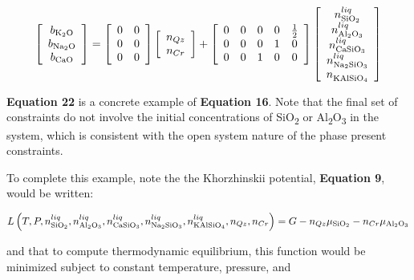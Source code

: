 \documentclass[11pt, titlepage, twoside]{article}
\begin{document}
\begin{MPEquation}[!ht]
\begin{equation}
\left[ {\begin{array}{*{20}{c}}
{{b_{{{\rm{K}}_2}{\rm{O}}}}}\\
{{b_{{\rm{N}}{{\rm{a}}_2}{\rm{O}}}}}\\
{{b_{{\rm{CaO}}}}}
\end{array}} \right] = \left[ {\begin{array}{*{20}{c}}
0&0\\
0&0\\
0&0
\end{array}} \right]\left[ {\begin{array}{*{20}{c}}
{{n_{Qz}}}\\
{{n_{Cr}}}
\end{array}} \right] + \left[ {\begin{array}{*{20}{c}}
0&0&0&0&{\frac{1}{2}}\\
0&0&0&1&0\\
0&0&1&0&0
\end{array}} \right]\left[ {\begin{array}{*{20}{c}}
{n_{{\rm{Si}}{{\rm{O}}_2}}^{liq}}\\
{n_{{\rm{A}}{{\rm{l}}_2}{{\rm{O}}_3}}^{liq}}\\
{n_{{\rm{CaSi}}{{\rm{O}}_3}}^{liq}}\\
{n_{{\rm{N}}{{\rm{a}}_2}{\rm{Si}}{{\rm{O}}_3}}^{liq}}\\
{n_{{\rm{KAlSi}}{{\rm{O}}_4}}^{}}
\end{array}} \right]
\end{equation}
\label{MPEquationElement:BDABB612-8384-45B2-EC16-0B998BAC47F5}
\end{MPEquation}
\textbf{Equation 22} is a concrete example of \textbf{Equation 16}. Note that the final set of constraints do not involve the initial concentrations of SiO\textsubscript{2} or Al\textsubscript{2}O\textsubscript{3} in the system, which is consistent with the open system nature of the phase present constraints.

To complete this example, note the the Khorzhinskii potential, \textbf{Equation 9}, would be written:


\begin{MPEquation}[!ht]
\begin{equation}
L\left( {T,P,n_{{\rm{Si}}{{\rm{O}}_2}}^{liq},n_{{\rm{A}}{{\rm{l}}_2}{{\rm{O}}_3}}^{liq},n_{{\rm{CaSi}}{{\rm{O}}_3}}^{liq},n_{{\rm{N}}{{\rm{a}}_2}{\rm{Si}}{{\rm{O}}_3}}^{liq},n_{{\rm{KAlSi}}{{\rm{O}}_4}}^{liq},{n_{Qz}},{n_{Cr}}} \right) = G - {n_{Qz}}{\mu _{{\rm{Si}}{{\rm{O}}_2}}} - {n_{Cr}}{\mu _{{\rm{A}}{{\rm{l}}_2}{{\rm{O}}_3}}}
\end{equation}
\label{MPEquationElement:4E0DEE58-BE21-4138-F6BE-DBF5E68FC512}
\end{MPEquation}
and that to compute thermodynamic equilibrium, this function would be minimized subject to constant temperature, pressure, and
\end{document}
